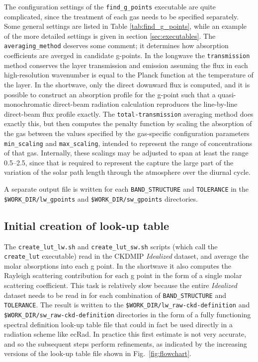 \documentclass[a4,oneside]{article}
\def\codesize{\small}
\def\codesize{\small}
\def\code#1{{\codesize\texttt{#1}}}
\begin{document}
The configuration settings of the \code{find\_g\_points} executable
are quite complicated, since the treatment of each gas needs to be
specified separately. Some general settings are listed in Table
\ref{tab:find_g_points}, while an example of the more detailed
settings is given in section \ref{sec:executables}. The
\code{averaging\_method} deserves some comment; it determines how
absorption coefficients are averged in candidate g-points.  In the
longwave the \code{transmission} method conserves the layer
transmission and emission assuming the flux in each high-resolution
wavenumber is equal to the Planck function at the temperature of the
layer. In the shortwave, only the direct downward flux is computed,
and it is possible to construct an absorption profile for the g-point
such that a quasi-monochromatic direct-beam radiation calculation
reproduces the line-by-line direct-beam flux profile exactly. The
\code{total-transmission} averaging method does exactly this, but then
computes the penalty function by scaling the absorption of the gas
between the values specified by the gas-specific configuration
parameters \code{min\_scaling} and \code{max\_scaling}, intended to
represent the range of concentrations of that gas. Internally, these
scalings may be adjusted to span at least the range 0.5--2.5, since
that is required to represent the capture the large part of the
variation of the solar path length through the atmosphere over the
diurnal cycle.

A separate output file is written for each \code{BAND\_STRUCTURE} and
\code{TOLERANCE} in the \code{\$WORK\_DIR/lw\_gpoints} and
\code{\$WORK\_DIR/sw\_gpoints} directories.

\subsection{Initial creation of look-up table}
\label{sec:create_lut}
The \code{create\_lut\_lw.sh} and \code{create\_lut\_sw.sh} scripts
(which call the \code{create\_lut} executable) read in the CKDMIP
\emph{Idealized} dataset, and average the molar absorptions into each
g point. In the shortwave it also computes the Rayleigh scattering
contribution for each g point in the form of a single molar scattering
coefficient. This task is relatively slow because the entire
\emph{Idealized} dataset needs to be read in for each combination of
\code{BAND\_STRUCTURE} and \code{TOLERANCE}. The result is written to
the \code{\$WORK\_DIR/lw\_raw-ckd-definition} and
\code{\$WORK\_DIR/sw\_raw-ckd-definition} directories in the form of a
fully functioning spectral definition look-up table file that could in
fact be used directly in a radiation scheme like ecRad. In practice
this first estimate is not very accurate, and so the subsequent steps
perform refinements, as indicated by the increasing versions of the
look-up table file shown in Fig.\ \ref{fig:flowchart}.
\end{document}
